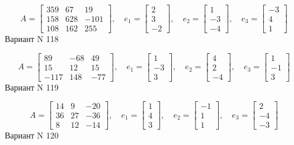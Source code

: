 \documentclass[11pt]{report}
\begin{document}
$$A = \left[\begin{matrix}359 & 67 & 19\\158 & 628 & -101\\108 & 162 & 255\end{matrix}\right],\quad e_1 = \left[\begin{matrix}2\\3\\-2\end{matrix}\right],\quad e_2 = \left[\begin{matrix}1\\-3\\-4\end{matrix}\right],\quad e_3 = \left[\begin{matrix}-3\\4\\1\end{matrix}\right]$$Вариант N 118

$$A = \left[\begin{matrix}89 & -68 & 49\\15 & 12 & 15\\-117 & 148 & -77\end{matrix}\right],\quad e_1 = \left[\begin{matrix}1\\-3\\3\end{matrix}\right],\quad e_2 = \left[\begin{matrix}4\\2\\-4\end{matrix}\right],\quad e_3 = \left[\begin{matrix}1\\-1\\3\end{matrix}\right]$$Вариант N 119

$$A = \left[\begin{matrix}14 & 9 & -20\\36 & 27 & -36\\8 & 12 & -14\end{matrix}\right],\quad e_1 = \left[\begin{matrix}1\\4\\3\end{matrix}\right],\quad e_2 = \left[\begin{matrix}-1\\1\\1\end{matrix}\right],\quad e_3 = \left[\begin{matrix}2\\-4\\-3\end{matrix}\right]$$Вариант N 120
\end{document}
